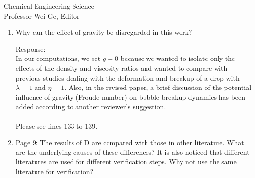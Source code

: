 \documentclass{letter}
\begin{document}
\begin{letter}{
Chemical Engineering Science\\
Professor Wei Ge, Editor\\}
\begin{enumerate}
Response: \\
The level set method, by itself, is not designed to directly conserve the
volume of materials.  The error is especially large at regions of high curvature.  The lack of volume conservation can significantly alter the numerical predictions.  On the other hand, the volume of fluid method, by itself, is not designed to accurately and robustly approximate the interface curvature.  The surface tension force will be incorrectly calculated if the curvature is not accurately approximated.  We have found that the CLSVOF method on the otherhand, in which we couple the two methods, is the optimal method.  We have added further discussion to the paper.

\\
\\

\par\noindent
\item
\textsf
{Why can the effect of gravity be disregarded in this work?\\}
\vspace{3 mm}

Response: \\
In our computations, we set $g = 0$ because we wanted to isolate only the effects of the density and viscosity ratios and 
wanted to compare with previous studies dealing with the deformation and breakup of a drop with $\lambda =1$ and $\eta = 1$. 
Also, in the revised paper, a brief discussion of the potential influence of gravity (Froude number) on bubble breakup dynamics 
has been added according to another reviewer's suggestion.\\
\\
Please see lines 133 to 139.
\\

\par\noindent
\item
\textsf
{Page 9: The results of D are compared with those in other literature. 
What are the underlying causes of these differences? It is also noticed that different literatures are used for different verification steps.
Why not use the same literature for verification?}
\vspace{3 mm}


\end{enumerate}
\end{letter}
\end{document}
